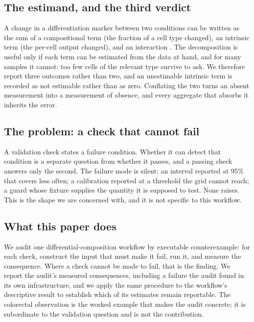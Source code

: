
\subsection{The estimand, and the third verdict}
A change in a differentiation marker between two conditions can be written as the
sum of a compositional term (the fraction of a cell type changed), an intrinsic
term (the per-cell output changed), and an interaction
\cite{kitagawa1955,blinder1973,oaxaca1973}. The decomposition is useful only if
each term can be estimated from the data at hand, and for many samples it cannot:
too few cells of the relevant type survive to ask. We therefore report three
outcomes rather than two, and an unestimable intrinsic term is recorded as not
estimable rather than as zero. Conflating the two turns an absent measurement
into a measurement of absence, and every aggregate that absorbs it inherits the
error.

\subsection{The problem: a check that cannot fail}
A validation check states a failure condition. Whether it can detect that
condition is a separate question from whether it passes, and a passing check
answers only the second. The failure mode is silent: an interval reported at 95\%
that covers less often; a calibration reported at a threshold the grid cannot
reach; a guard whose fixture supplies the quantity it is supposed to test. None
raises. This is the shape we are concerned with, and it is not specific to this
workflow.

\subsection{What this paper does}
We audit one differential-composition workflow by executable counterexample: for
each check, construct the input that must make it fail, run it, and measure the
consequence. Where a check cannot be made to fail, that is the finding. We report
the audit's measured consequences, including a failure the audit found in its own
infrastructure, and we apply the same procedure to the workflow's descriptive
result to establish which of its estimates remain reportable. The colorectal
observation is the worked example that makes the audit concrete; it is
subordinate to the validation question and is not the contribution.

